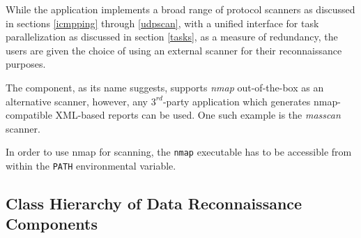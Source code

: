 \documentclass[a4paper,12pt]{article}
\begin{document}
	While the application implements a broad range of protocol scanners as discussed in sections \ref{icmpping} through \ref{udpscan}, with a unified interface for task parallelization as discussed in section \ref{tasks}, as a measure of redundancy, the users are given the choice of using an external scanner for their reconnaissance purposes.
	
	The component, as its name suggests, supports \textit{nmap} out-of-the-box as an alternative scanner, however, any $3^{rd}$-party application which generates nmap-compatible XML-based reports can be used. One such example is the \textit{masscan} scanner.
	
	In order to use nmap for scanning, the \texttt{nmap} executable has to be accessible from within the \texttt{PATH} environmental variable.

\newpage
\subsection{Class Hierarchy of Data Reconnaissance Components}
 
\end{document}
